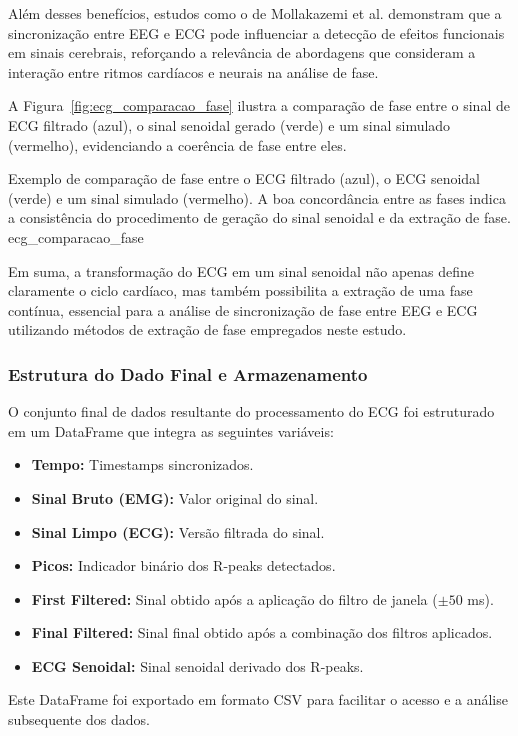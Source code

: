 Além desses benefícios, estudos como o de Mollakazemi et al. \cite{mollakazemi2021eeg} demonstram que a sincronização entre EEG e ECG pode influenciar a detecção de efeitos funcionais em sinais cerebrais, reforçando a relevância de abordagens que consideram a interação entre ritmos cardíacos e neurais na análise de fase.

A Figura~\ref{fig:ecg_comparacao_fase} ilustra a comparação de fase entre o sinal de ECG filtrado (azul), o sinal senoidal gerado (verde) e um sinal simulado (vermelho), evidenciando a coerência de fase entre eles.


{Exemplo de comparação de fase entre o ECG filtrado (azul), o ECG senoidal (verde) e um sinal simulado (vermelho). A boa concordância entre as fases indica a consistência do procedimento de geração do sinal senoidal e da extração de fase.}
{ecg_comparacao_fase}


Em suma, a transformação do ECG em um sinal senoidal não apenas define claramente o ciclo cardíaco, mas também possibilita a extração de uma fase contínua, essencial para a análise de sincronização de fase entre EEG e ECG utilizando métodos de extração de fase empregados neste estudo.

\subsubsection{Estrutura do Dado Final e Armazenamento}

O conjunto final de dados resultante do processamento do ECG foi estruturado em um DataFrame que integra as seguintes variáveis:
\begin{itemize}
    \item \textbf{Tempo:} Timestamps sincronizados.
    \item \textbf{Sinal Bruto (EMG):} Valor original do sinal.
    \item \textbf{Sinal Limpo (ECG):} Versão filtrada do sinal.
    \item \textbf{Picos:} Indicador binário dos R-peaks detectados.
    \item \textbf{First Filtered:} Sinal obtido após a aplicação do filtro de janela (\(\pm50\) ms).
    \item \textbf{Final Filtered:} Sinal final obtido após a combinação dos filtros aplicados.
    \item \textbf{ECG Senoidal:} Sinal senoidal derivado dos R-peaks.
\end{itemize}

Este DataFrame foi exportado em formato CSV para facilitar o acesso e a análise subsequente dos dados.
